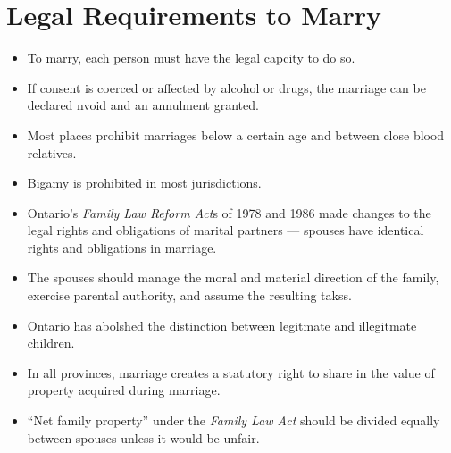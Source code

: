\documentclass{article}
\begin{document}
\section{Legal Requirements to Marry}
\begin{itemize}
    \item To marry, each person must have the legal capcity to do so.
    \item If consent is coerced or affected by alcohol or drugs, the marriage can be declared nvoid and an annulment granted.
    \item Most places prohibit marriages below a certain age and between close blood relatives.
    \item Bigamy is prohibited in most jurisdictions.
    \item Ontario's \emph{Family Law Reform Act}s of 1978 and 1986 made changes to the legal rights and obligations of marital partners --- spouses have identical rights and obligations in marriage.
    \item The spouses should manage the moral and material direction of the family, exercise parental authority, and assume the resulting takss.
    \item Ontario has abolshed the distinction between legitmate and illegitmate children.
    \item In all provinces, marriage creates a statutory right to share in the value of property acquired during marriage.
    \item ``Net family property'' under the \emph{Family Law Act} should be divided equally between spouses unless it would be unfair.
\end{itemize}
\end{document}
